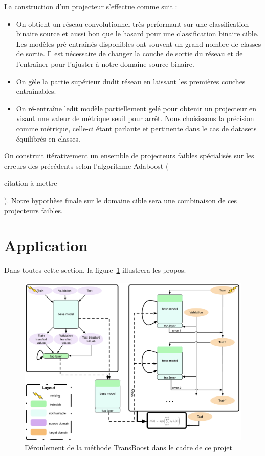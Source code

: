 \documentclass[11 pt]{article}
\begin{document}
\pagebreak

\begin{samepage}
La construction d'un projecteur s'effectue comme suit : \medskip
  \begin{itemize}
    \item On obtient un réseau convolutionnel très performant sur une classification binaire source et aussi bon que le hasard pour une classification binaire cible. Les modèles pré-entraînés disponibles ont souvent un grand nombre de classes de sortie. Il est nécessaire de changer la couche de sortie du réseau et de l’entraîner pour l’ajuster à notre domaine source binaire. 
    \nopagebreak
    \item On gèle la partie supérieur dudit réseau en laissant les premières couches entraînables.
    \nopagebreak
    \item On ré-entraîne ledit modèle partiellement gelé pour obtenir un projecteur en visant une valeur de métrique seuil pour arrêt. Nous choisissons la précision comme métrique, celle-ci étant parlante et pertinente dans le cas de datasets équilibrés en classes.
  \end{itemize}
\end{samepage}

On construit itérativement un ensemble de projecteurs faibles spécialisés sur les erreurs des précédents selon l'algorithme Adaboost (\begin{huge} citation à mettre \end{huge}). Notre hypothèse finale sur le domaine cible sera une combinaison de ces projecteurs faibles.

\section{Application}

Dans toutes cette section, la figure~\ref{figRes} illustrera les propos.

\begin{figure}[H]
  \includegraphics[width=\textwidth]{fig1.pdf}
  \caption{Déroulement de la méthode TransBoost dans le cadre de ce projet}
  \label{figRes}
\end{figure}
\end{document}
